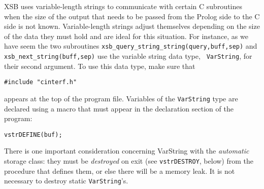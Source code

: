  XSB uses variable-length strings to communicate with
certain C subroutines when the size of the output that needs to be passed
from the Prolog side to the C side is not known. Variable-length strings
adjust themselves depending on the size of the data they must hold and are
ideal for this situation. For instance, as we have seem the two subroutines
{\tt xsb\_query\_string\_string(query,buff,sep)} and {\tt
  xsb\_next\_string(buff,sep)} use the variable string data type, {\tt
  VarString}, for their second argument.  To use this data type, make sure
that
\begin{verbatim}
#include "cinterf.h"  
\end{verbatim}
appears at the top of the program file.  Variables of the {\tt VarString}
type are declared using a macro that must appear in the declaration section
of the program:
\begin{verbatim}
vstrDEFINE(buf);  
\end{verbatim}
There is one important consideration concerning VarString with the
\emph{automatic} storage class: they must be
\emph{destroyed} on exit (see {\tt vstrDESTROY}, below) from the procedure
that defines them, or else there will be a memory leak. 
It is not necessary to destroy static {\tt VarString}'s.

